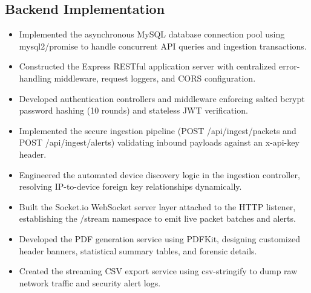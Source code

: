 \documentclass[a4paper,12pt]{report}
\begin{document}
	\subsection{Backend Implementation}
	\begin{itemize}
		\item Implemented the asynchronous MySQL database connection pool using mysql2/promise to handle concurrent API queries and ingestion transactions.
		\item Constructed the Express RESTful application server with centralized error-handling middleware, request loggers, and CORS configuration.
		\item Developed authentication controllers and middleware enforcing salted bcrypt password hashing (10 rounds) and stateless JWT verification.
		\item Implemented the secure ingestion pipeline (POST /api/ingest/packets and POST /api/ingest/alerts) validating inbound payloads against an x-api-key header.
		\item Engineered the automated device discovery logic in the ingestion controller, resolving IP-to-device foreign key relationships dynamically.
		\item Built the Socket.io WebSocket server layer attached to the HTTP listener, establishing the /stream namespace to emit live packet batches and alerts.
		\item Developed the PDF generation service using PDFKit, designing customized header banners, statistical summary tables, and forensic details.
		\item Created the streaming CSV export service using csv-stringify to dump raw network traffic and security alert logs.
	\end{itemize}
	
\end{document}

